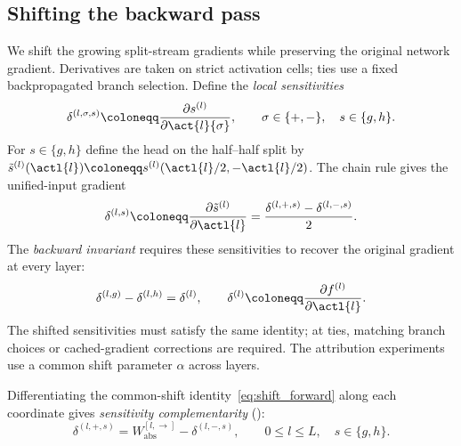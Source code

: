 \subsection{Shifting the backward pass}\label{subsec:backward_stabilization}

We shift the growing split-stream gradients while preserving the original network gradient. Derivatives are taken on strict activation cells; ties use a fixed backpropagated branch selection. Define the \emph{local sensitivities}
\begin{equation}
    \delta^{(l,\sigma,s)}\coloneqq\frac{\partial s^{(l)}}{\partial\act{l}{\sigma}},
    \qquad \sigma\in\{+,-\},\quad s\in\{g,h\}.
    \label{eq:local_sensitivities}
\end{equation}
For $s\in\{g,h\}$ define the head on the half--half split by $\tilde s^{(l)}(\actl{l})\coloneqq s^{(l)}(\actl{l}/2,-\actl{l}/2)$. The chain rule gives the unified-input gradient
\begin{equation}
\delta^{(l,s)}\coloneqq\frac{\partial\tilde s^{(l)}}{\partial\actl{l}}
=\frac{\delta^{(l,+,s)}-\delta^{(l,-,s)}}2.
\label{eq:unified_split_gradients}
\end{equation}
The \emph{backward invariant} requires these sensitivities to recover the original gradient at every layer:
\begin{equation}
\delta^{(l,g)}-\delta^{(l,h)}=\delta^{(l)},
\qquad
\delta^{(l)}\coloneqq\frac{\partial f^{(l)}}{\partial\actl{l}}.
\label{eq:stabilization_backward_invariant}
\end{equation}
The shifted sensitivities must satisfy the same identity; at ties, matching branch choices or cached-gradient corrections are required. The attribution experiments use a common shift parameter $\alpha$ across layers.

Differentiating the common-shift identity~\eqref{eq:shift_forward} along each coordinate gives \emph{sensitivity complementarity} ():
\begin{equation}
    \delta^{(l,+,s)}=W_{\mathrm{abs}}^{[l,\rightarrow]}-\delta^{(l,-,s)},
    \qquad 0\le l\le L,\quad s\in\{g,h\}.
    \label{eq:delta_complementarity}
\end{equation}

